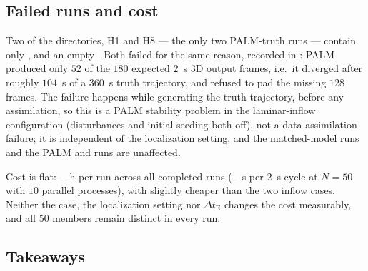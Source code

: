 \subsection{Failed runs and cost}
\label{sec:fs:failed}

Two of the \HybNumRuns{} directories, H1 and H8 --- the only two PALM-truth
 runs --- contain only ,  and an
empty . Both failed for the same reason, recorded in
: PALM produced only $52$ of the $180$ expected $2$~s 3D
output frames, i.e.\ it diverged after roughly $104$~s of a $360$~s truth
trajectory, and  refused to pad
the missing $128$ frames. The failure happens while generating the truth
trajectory, before any assimilation, so this is a PALM stability problem in the
laminar-inflow configuration (disturbances and initial seeding both off), not a
data-assimilation failure; it is independent of the localization setting, and
the matched-model  runs and the PALM  and
 runs are unaffected.

Cost is flat: \HybWallMin--\HybWallMax~h per run across all \HybNumOk{}
completed runs (\HybCycleMin--\HybCycleMax~s per $2$~s cycle at $N = 50$ with
$10$ parallel processes), with  slightly cheaper than the two
inflow cases. Neither the case, the localization setting nor
$\Delta t_{\mathrm{E}}$ changes the cost measurably, and all $50$ members remain
distinct in every run.

\subsection{Takeaways}
\label{sec:fs:takeaways}

